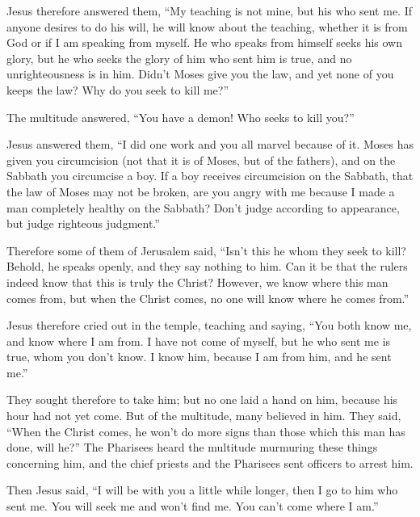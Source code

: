  Jesus therefore answered them, ``My teaching is not
mine, but his who sent me.  If anyone desires to do his
will, he will know about the teaching, whether it is from God or if I am
speaking from myself.  He who speaks from himself seeks
his own glory, but he who seeks the glory of him who sent him is true,
and no unrighteousness is in him.  Didn't Moses give you
the law, and yet none of you keeps the law? Why do you seek to kill
me?''

 The multitude answered, ``You have a demon! Who seeks to
kill you?''

 Jesus answered them, ``I did one work and you all marvel
because of it.  Moses has given you circumcision (not
that it is of Moses, but of the fathers), and on the Sabbath you
circumcise a boy.  If a boy receives circumcision on the
Sabbath, that the law of Moses may not be broken, are you angry with me
because I made a man completely healthy on the Sabbath? 
Don't judge according to appearance, but judge righteous judgment.''

 Therefore some of them of Jerusalem said, ``Isn't this
he whom they seek to kill?  Behold, he speaks openly, and
they say nothing to him. Can it be that the rulers indeed know that this
is truly the Christ?  However, we know where this man
comes from, but when the Christ comes, no one will know where he comes
from.''

 Jesus therefore cried out in the temple, teaching and
saying, ``You both know me, and know where I am from. I have not come of
myself, but he who sent me is true, whom you don't know. 
I know him, because I am from him, and he sent me.''

 They sought therefore to take him; but no one laid a
hand on him, because his hour had not yet come.  But of
the multitude, many believed in him. They said, ``When the Christ comes,
he won't do more signs than those which this man has done, will he?''
 The Pharisees heard the multitude murmuring these things
concerning him, and the chief priests and the Pharisees sent officers to
arrest him.

 Then Jesus said, ``I will be with you a little while
longer, then I go to him who sent me.  You will seek me
and won't find me. You can't come where I am.''

